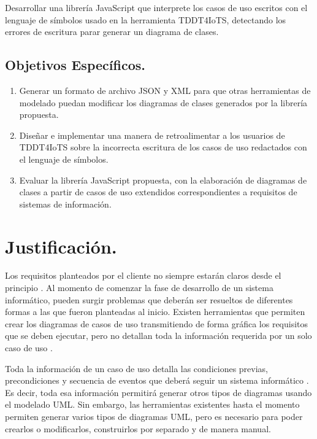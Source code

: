 Desarrollar una librería JavaScript que interprete los casos de uso escritos con el lenguaje de símbolos usado en la herramienta TDDT4IoTS, detectando los errores de escritura parar generar un diagrama de clases. 

\subsection{Objetivos Específicos.}

\begin{enumerate}
	\item Generar un formato de archivo JSON y XML para que otras herramientas de modelado puedan modificar los diagramas de clases generados por la librería propuesta.
	
	\item Diseñar e implementar una manera de retroalimentar a los usuarios de TDDT4IoTS sobre la incorrecta escritura de los casos de uso redactados con el lenguaje de símbolos. 
	
	\item Evaluar la librería JavaScript propuesta, con la elaboración de diagramas de clases a partir de casos de uso extendidos correspondientes a requisitos de sistemas de información.
\end{enumerate}

\section{Justificación.}

Los requisitos planteados por el cliente no siempre estarán claros desde el principio \parencite{iqbal2020}. Al momento de comenzar la fase de desarrollo de un sistema informático, pueden surgir problemas que deberán ser resueltos de diferentes formas a las que fueron planteadas al inicio. Existen herramientas que permiten crear los diagramas de casos de uso transmitiendo de forma gráfica los requisitos que se deben ejecutar, pero no detallan toda la información requerida por un solo caso de uso \parencite{Abdelnabi2021}.

Toda la información de un caso de uso detalla las condiciones previas, precondiciones y secuencia de eventos que deberá seguir un sistema informático \parencite{iqbal2020}. Es decir, toda esa información permitirá generar otros tipos de diagramas usando el modelado UML. Sin embargo, las herramientas existentes hasta el momento permiten generar varios tipos de diagramas UML, pero es necesario para poder crearlos o modificarlos, construirlos por separado y de manera manual.

